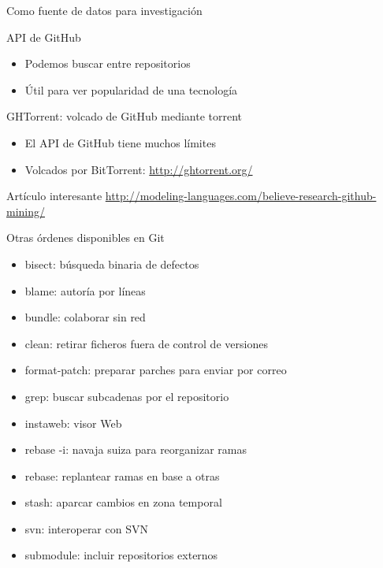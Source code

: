 \documentclass[xcolor=svgnames]{beamer}
\newcommand*{\inlinecmd}[1]{{\small\ttfamily\nohyphens{#1}}}
\begin{document}
\begin{frame}{Como fuente de datos para investigación}
  \begin{block}{API de GitHub}
    \begin{itemize}
    \item Podemos buscar entre repositorios
    \item Útil para ver popularidad de una tecnología
    \end{itemize}
  \end{block}
  
  \begin{block}{GHTorrent: volcado de GitHub mediante torrent}
    \begin{itemize}
    \item El API de GitHub tiene muchos límites
    \item Volcados por BitTorrent: \url{http://ghtorrent.org/}
    \end{itemize}
  \end{block}

  \begin{block}{Artículo interesante}
    \scriptsize
    \url{http://modeling-languages.com/believe-research-github-mining/}    
  \end{block}

\end{frame}

\appendix

\begin{frame}{Otras órdenes disponibles en Git}
  \begin{itemize}
  \item \inlinecmd{bisect}: búsqueda binaria de defectos
  \item \inlinecmd{blame}: autoría por líneas
  \item \inlinecmd{bundle}: colaborar sin red
  \item \inlinecmd{clean}: retirar ficheros fuera de control de versiones
  \item \inlinecmd{format-patch}: preparar parches para enviar por correo
  \item \inlinecmd{grep}: buscar subcadenas por el repositorio
  \item \inlinecmd{instaweb}: visor Web
  \item \inlinecmd{rebase -i}: navaja suiza para reorganizar ramas
  \item \inlinecmd{rebase}: replantear ramas en base a otras
  \item \inlinecmd{stash}: aparcar cambios en zona temporal
  \item \inlinecmd{svn}: interoperar con SVN
  \item \inlinecmd{submodule}: incluir repositorios externos
  \end{itemize}
\end{frame}
\end{document}

